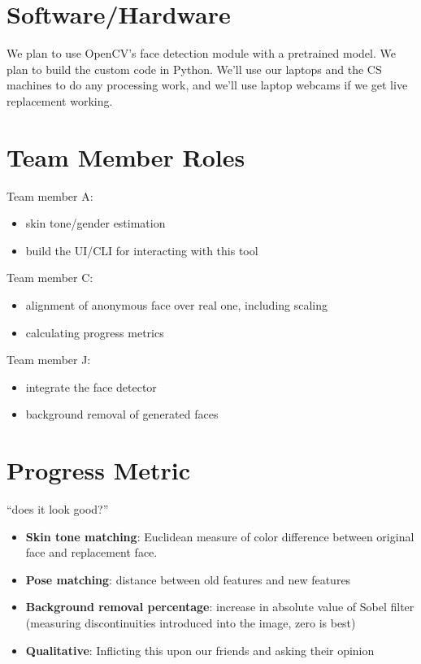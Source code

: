 \section*{Software/Hardware}

We plan to use OpenCV's face detection module with a pretrained model.
We plan to build the custom code in Python. We'll use our laptops and the CS machines to do any processing work, and we'll use laptop webcams if we get live replacement working.

\pagebreak

\section*{Team Member Roles}


Team member A:
\begin{itemize}
    \item skin tone/gender estimation
    \item build the UI/CLI for interacting with this tool
\end{itemize}

Team member C:

\begin{itemize}
    \item alignment of anonymous face over real one, including scaling
    \item calculating progress metrics
\end{itemize}

Team member J:
\begin{itemize}
    \item integrate the face detector
    \item background removal of generated faces
\end{itemize}


\section*{Progress Metric}


``does it look good?''

\begin{itemize}
    \item \textbf{Skin tone matching}: Euclidean measure of color difference between original face and replacement face.
    \item \textbf{Pose matching}: distance between old features and new features
    \item \textbf{Background removal percentage}: increase in absolute value of Sobel filter (measuring discontinuities introduced into the image, zero is best)
    \item \textbf{Qualitative}: Inflicting this upon our friends and asking their opinion
\end{itemize}

